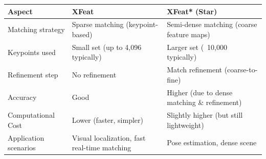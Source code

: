 {\footnotesize
\begin{tabular}{|l|l|l|}
    \hline
    Aspect                & XFeat                                        & XFeat* (Star)                                \\
    \hline
    Matching strategy     & Sparse matching (keypoint-based)             & Semi-dense matching (coarse feature maps)    \\
    \hline
    Keypoints used        & Small set (up to 4,096 typically)            & Larger set (~10,000 typically)               \\
    \hline
    Refinement step       & No refinement                                & Match refinement (coarse-to-fine)            \\
    \hline
    Accuracy              & Good                                         & Higher (due to dense matching \& refinement) \\
    \hline
    Computational Cost    & Lower (faster, simpler)                      & Slightly higher (but still lightweight)      \\
    \hline
    Application scenarios & Visual localization, fast real-time matching & Pose estimation, dense scene                 \\
    \hline
\end{tabular}
}
